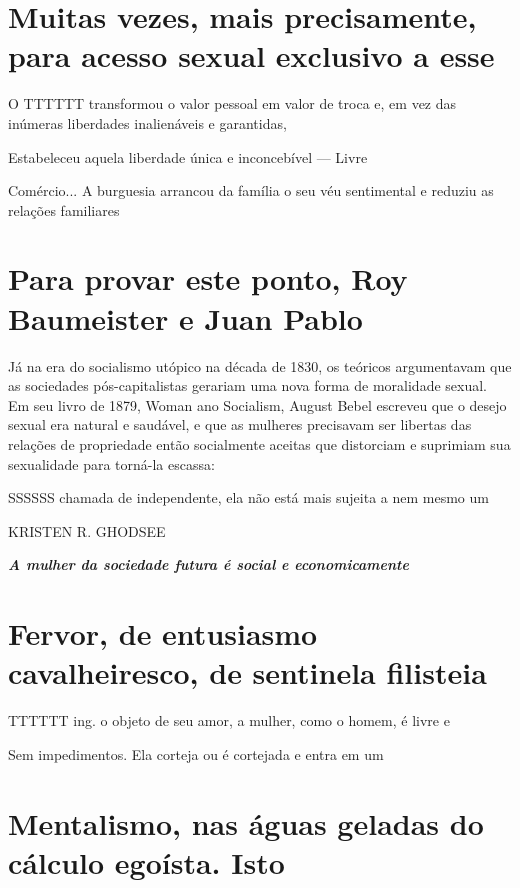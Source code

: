 \section{Muitas vezes, mais precisamente, para acesso sexual exclusivo a esse}
 \par 
O TTTTTT transformou o valor pessoal em valor de troca e, em vez das inúmeras liberdades inalienáveis ​​e garantidas,
 \par 
Estabeleceu aquela liberdade única e inconcebível — Livre
 \par 
Comércio... A burguesia arrancou da família o seu véu sentimental e reduziu as relações familiares
 \par 
\section{Para provar este ponto, Roy Baumeister e Juan Pablo}
 \par 
Já na era do socialismo utópico na década de 1830, os teóricos argumentavam que as sociedades pós-capitalistas gerariam uma nova forma de moralidade sexual. Em seu livro de 1879, Woman ano Socialism, August Bebel escreveu que o desejo sexual era natural e saudável, e que as mulheres precisavam ser libertas das relações de propriedade então socialmente aceitas que distorciam e suprimiam sua sexualidade para torná-la escassa:
 \par 
SSSSSS chamada de independente, ela não está mais sujeita a nem mesmo um
 \par 
KRISTEN R. GHODSEE
 \par 
\textit\textbf{ {A mulher da sociedade futura é social e economicamente} }
 \par 
\section{Fervor, de entusiasmo cavalheiresco, de sentinela filisteia}
 \par 
TTTTTT ing. o objeto de seu amor, a mulher, como o homem, é livre e
 \par 
Sem impedimentos. Ela corteja ou é cortejada e entra em um
 \par 
\section{Mentalismo, nas águas geladas do cálculo egoísta. Isto}
 \par 
